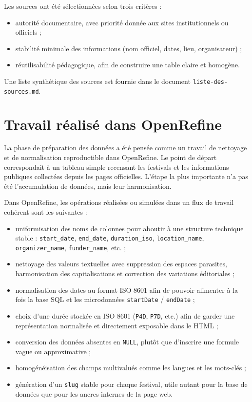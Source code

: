 \documentclass[11pt,a4paper]{article}
\begin{document}
Les sources ont été sélectionnées selon trois critères :

\begin{itemize}
    \item autorité documentaire, avec priorité donnée aux sites institutionnels ou officiels ;
    \item stabilité minimale des informations (nom officiel, dates, lieu, organisateur) ;
    \item réutilisabilité pédagogique, afin de construire une table claire et homogène.
\end{itemize}

Une liste synthétique des sources est fournie dans le document \texttt{liste-des-sources.md}.

\section{Travail réalisé dans OpenRefine}

La phase de préparation des données a été pensée comme un travail de nettoyage et de normalisation reproductible dans OpenRefine. Le point de départ correspondait à un tableau simple recensant les festivals et les informations publiques collectées depuis les pages officielles. L'étape la plus importante n'a pas été l'accumulation de données, mais leur harmonisation.

Dans OpenRefine, les opérations réalisées ou simulées dans un flux de travail cohérent sont les suivantes :

\begin{itemize}
    \item uniformisation des noms de colonnes pour aboutir à une structure technique stable : \texttt{start\_date}, \texttt{end\_date}, \texttt{duration\_iso}, \texttt{location\_name}, \texttt{organizer\_name}, \texttt{funder\_name}, etc. ;
    \item nettoyage des valeurs textuelles avec suppression des espaces parasites, harmonisation des capitalisations et correction des variations éditoriales ;
    \item normalisation des dates au format ISO 8601 afin de pouvoir alimenter à la fois la base SQL et les microdonnées \texttt{startDate} / \texttt{endDate} ;
    \item choix d'une durée stockée en ISO 8601 (\texttt{P4D}, \texttt{P7D}, etc.) afin de garder une représentation normalisée et directement exposable dans le HTML ;
    \item conversion des données absentes en \texttt{NULL}, plutôt que d'inscrire une formule vague ou approximative ;
    \item homogénéisation des champs multivalués comme les langues et les mots-clés ;
    \item génération d'un \texttt{slug} stable pour chaque festival, utile autant pour la base de données que pour les ancres internes de la page web.
\end{itemize}
\end{document}
